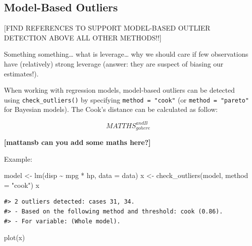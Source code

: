 \documentclass[
]{article}
\newenvironment{Shaded}{\begin{snugshade}}{\end{snugshade}}
\newcommand{\AttributeTok}[1]{\textcolor[rgb]{0.77,0.63,0.00}{#1}}
\newcommand{\FunctionTok}[1]{\textcolor[rgb]{0.00,0.00,0.00}{#1}}
\newcommand{\NormalTok}[1]{#1}
\newcommand{\OtherTok}[1]{\textcolor[rgb]{0.56,0.35,0.01}{#1}}
\newcommand{\SpecialCharTok}[1]{\textcolor[rgb]{0.00,0.00,0.00}{#1}}
\newcommand{\StringTok}[1]{\textcolor[rgb]{0.31,0.60,0.02}{#1}}
\begin{document}
\hypertarget{model-based-outliers}{%
\subsection{Model-Based Outliers}\label{model-based-outliers}}

{[}FIND REFERENCES TO SUPPORT MODEL-BASED OUTLIER DETECTION ABOVE ALL OTHER METHODS!!{]}

Something something\ldots{} what is leverage\ldots{} why we should care if few observations have (relatively) strong leverage (answer: they are suspect of biasing our estimates!).

When working with regression models, model-based outliers can be detected using \texttt{check\_outliers()} by specifying \texttt{method\ =\ "cook"} (or \texttt{method\ =\ "pareto"} for Bayesian models). The Cook's distance can be calculated as follow:

\[
MATTHS_{gohere}^{andB}
\]

\textbf{{[}mattansb can you add some maths here?{]}}

Example:



\begin{Shaded}
\begin{Highlighting}[]
\NormalTok{model }\OtherTok{\textless{}{-}} \FunctionTok{lm}\NormalTok{(disp }\SpecialCharTok{\textasciitilde{}}\NormalTok{ mpg }\SpecialCharTok{*}\NormalTok{ hp, }\AttributeTok{data =}\NormalTok{ data)}
\NormalTok{x }\OtherTok{\textless{}{-}} \FunctionTok{check\_outliers}\NormalTok{(model, }\AttributeTok{method =} \StringTok{"cook"}\NormalTok{)}
\NormalTok{x}
\end{Highlighting}
\end{Shaded}

\begin{verbatim}
#> 2 outliers detected: cases 31, 34.
#> - Based on the following method and threshold: cook (0.86).
#> - For variable: (Whole model).
\end{verbatim}

\begin{Shaded}
\begin{Highlighting}[]
\FunctionTok{plot}\NormalTok{(x)}
\end{Highlighting}
\end{Shaded}
\end{document}
